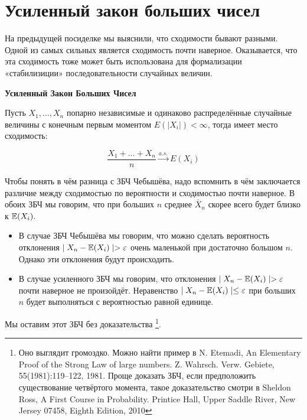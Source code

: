 \documentclass[12pt, a4paper, oneside]{article}
\begin{document}
\section{Усиленный закон больших чисел}

На предыдущей посиделке мы выяснили, что сходимости бывают разными. Одной из самых сильных является сходимость почти наверное. Оказывается, что эта сходимость тоже может быть использована для формализации «стабилизиции» последовательности случайных величин.

\begin{theorem}{\textbf{Усиленный Закон Больших Чисел}}

Пусть $X_1, \ldots, X_n$ попарно независимые и одинаково распределённые случайные величины с конечным первым моментом $E(|X_i|) < \infty$, тогда имеет место сходимость:

$$
\frac{X_1 + \ldots + X_n}{n} \overset{a.s.}{\to} E(X_i)
$$
\end{theorem}

Чтобы понять в чём разница с ЗБЧ Чебышёва, надо вспомнить в чём заключается различие между сходимостью по вероятности и сходимостью почти наверное. В обоих ЗБЧ мы говорим, что при больших $n$  среднее $\bar X_n$ скорее всего будет близко к $\mathbb{E}(X_i).$ 

\begin{itemize} 
    \item В случае ЗБЧ Чебышёва мы говорим, что можно сделать вероятность отклонения $\mid X_n - \mathbb{E}(X_i) \mid > \varepsilon$ очень маленькой при достаточно большом $n$. Однако эти отклонения будут происходить. 

    \item В случае усиленного ЗБЧ мы говорим, что отклонения $\mid X_n - \mathbb{E}(X_i) \mid > \varepsilon$ почти наверное не произойдёт. Неравенство $\mid X_n - \mathbb{E}(X_i) \mid  \le \varepsilon$ при больших $n$ будет выполняться с вероятностью равной единице. 
\end{itemize} 

Мы оставим этот ЗБЧ без доказательства \footnote{Оно выглядит громоздко. Можно найти пример в N. Etemadi, An Elementary Proof of the Strong Law of large numbers. Z. Wahrsch. Verw. Gebiete, 55(1981):119--122, 1981. \newline Проще доказать ЗБЧ, если предположить существование четвёртого момента, такое доказательство смотри в Sheldon Ross, A First Course in Probability. Printice Hall, Upper Saddle River, New Jersey 07458, Eighth Edition, 2010}. 
\end{document}
